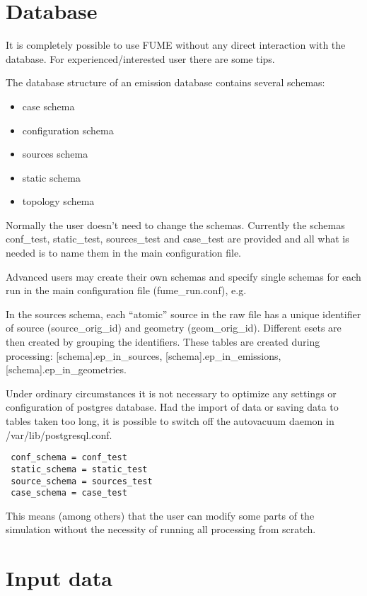 \documentclass[a4paper,11pt]{article}
\begin{document}
\section{Database}\label{database}
It is completely possible to use FUME without any direct interaction with the database. For experienced/interested user there are some tips.

The database structure of an emission database contains several schemas:

\begin{itemize}
\item
  case schema
\item
  configuration schema
\item
  sources schema
\item
  static schema
\item
  topology schema
\end{itemize}

Normally the user doesn't need to change the schemas. Currently the
schemas conf\_test, static\_test, sources\_test and case\_test are
provided and all what is needed is to name them in the main
configuration file.

Advanced users may create their own schemas and specify single schemas
for each run in the main configuration file (fume\_run.conf), e.g.

In the sources schema, each ``atomic'' source in the raw file has a
unique identifier of source (source\_orig\_id) and geometry
(geom\_orig\_id). Different esets are then created by grouping the
identifiers. These tables are created during processing:
{[}schema{]}.ep\_in\_sources, {[}schema{]}.ep\_in\_emissions,
{[}schema{]}.ep\_in\_geometries.

Under ordinary circumstances it is not necessary to optimize any
settings or configuration of postgres database. Had the import of data
or saving data to tables taken too long, it is possible to switch off
the autovacuum daemon in /var/lib/postgresql.conf.

\begin{verbatim}
 conf_schema = conf_test 
 static_schema = static_test 
 source_schema = sources_test 
 case_schema = case_test 
\end{verbatim}

This means (among others) that the user can modify some parts of the
simulation without the necessity of running all processing from scratch.

\section{Input data}\label{input-data}
\end{document}
